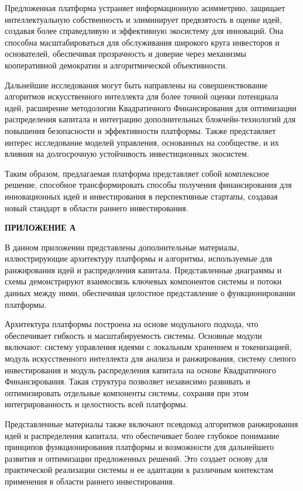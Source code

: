 \documentclass[
    candidate, %
    subf, %
]{disser}
\begin{document}
Предложенная платформа устраняет информационную асимметрию, защищает интеллектуальную собственность и элиминирует предвзятость в оценке идей, создавая более справедливую и эффективную экосистему для инноваций. Она способна масштабироваться для обслуживания широкого круга инвесторов и основателей, обеспечивая прозрачность и доверие через механизмы кооперативной демократии и алгоритмической объективности.

Дальнейшие исследования могут быть направлены на совершенствование алгоритмов искусственного интеллекта для более точной оценки потенциала идей, расширение методологии Квадратичного Финансирования для оптимизации распределения капитала и интеграцию дополнительных блокчейн-технологий для повышения безопасности и эффективности платформы. Также представляет интерес исследование моделей управления, основанных на сообществе, и их влияния на долгосрочную устойчивость инвестиционных экосистем.

Таким образом, предлагаемая платформа представляет собой комплексное решение, способное трансформировать способы получения финансирования для инновационных идей и инвестирования в перспективные стартапы, создавая новый стандарт в области раннего инвестирования.

\newpage
{} %
\renewcommand{\bibsection}{\centering\textbf{\large СПИСОК ИСПОЛЬЗОВАННЫХ ИСТОЧНИКОВ}} %



\newpage
\begin{center}
  \textbf{\large ПРИЛОЖЕНИЕ А}
\end{center}

В данном приложении представлены дополнительные материалы, иллюстрирующие архитектуру платформы и алгоритмы, используемые для ранжирования идей и распределения капитала. Представленные диаграммы и схемы демонстрируют взаимосвязь ключевых компонентов системы и потоки данных между ними, обеспечивая целостное представление о функционировании платформы.

Архитектура платформы построена на основе модульного подхода, что обеспечивает гибкость и масштабируемость системы. Основные модули включают: систему управления идеями с локальным хранением и токенизацией, модуль искусственного интеллекта для анализа и ранжирования, систему слепого инвестирования и модуль распределения капитала на основе Квадратичного Финансирования. Такая структура позволяет независимо развивать и оптимизировать отдельные компоненты системы, сохраняя при этом интегрированность и целостность всей платформы.

Представленные материалы также включают псевдокод алгоритмов ранжирования идей и распределения капитала, что обеспечивает более глубокое понимание принципов функционирования платформы и возможности для дальнейшего развития и оптимизации предложенных решений. Это создает основу для практической реализации системы и ее адаптации к различным контекстам применения в области раннего инвестирования.
\end{document}

